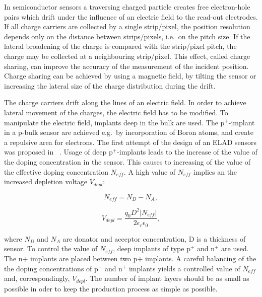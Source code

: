 
In semiconductor sensors a traversing charged particle creates free electron-hole pairs which drift under the influence of an electric field to the read-out electrodes. 
If all charge carriers are collected by a single strip/pixel, the position resolution depends only on the distance between strips/pixels, i.e.\ on the pitch size. 
If the lateral broadening of the charge is compared with the strip/pixel pitch, the charge may be collected at a neighbouring strip/pixel. 
This effect, called charge sharing, can improve the accuracy of the measurement of the incident position. 
Charge sharing can be achieved by using a magnetic field, by tilting the sensor or increasing the lateral size of the charge distribution during the drift.

The charge carriers drift along the lines of an electric field. 
In order to achieve lateral movement of the charges, the electric field has to be modified. 
To manipulate the electric field, implants deep in the bulk are used. 
The p$^+$-implant  in a p-bulk sensor are achieved e.g.\ by incorporation of Boron atoms, and  create a repulsive area for electrons. 
The first attempt of the design of an ELAD sensors was proposed in ~\cite{JANSEN2016242}. 
Usage of deep p$^+$-implants leads to the increase of the value of the doping concentration in the sensor. 
This causes to increasing of the value of the effective doping concentration $N_{eff}$. 
A high value of $N_{eff}$ implies an the increased depletion voltage $V_{depl}$: 

\begin{equation}
 N_{eff}=N_{D}-N_{A} ,
\end{equation}

\begin{equation}
 V_{depl}=\frac{q_0 D^2 |N_{eff}|}{2 \epsilon_r \epsilon_0 } ,
\end{equation}

\noindent where $N_{D}$ and $N_{A}$ are donator and acceptor concentration, D is a thickness of sensor.
To control the value of $N_{eff}$, deep implants of type p$^+$ and n$^+$ are used. 
The n+ implants are placed between two p+ implants. 
A careful balancing of the the doping concentrations of p$^+$ and n$^+$ implants yields a controlled value of $N_{eff}$ and, correspondingly, $V_{depl}$. 
The number of implant layers should be as small as possible in oder to keep the production process as simple as possible. 
